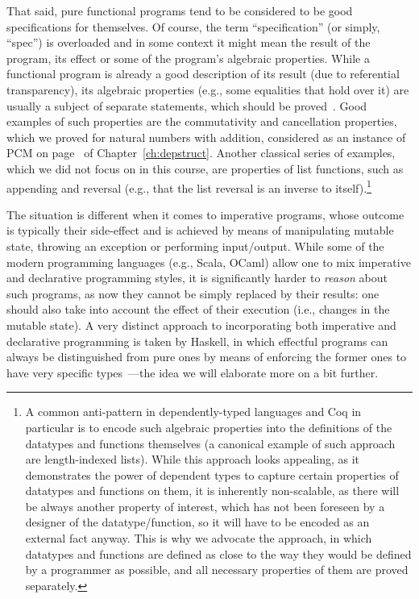 That said, pure functional programs tend to be considered to be good
specifications for themselves. Of course, the term ``specification'' (or
simply, ``spec'')  is overloaded and in
some context it might mean the result of the program, its effect or
some of the program's algebraic properties. While a functional program
is already a good description of its result (due to referential
transparency), its algebraic properties (e.g., some equalities that
hold over it) are usually a subject of separate statements, which
should be proved~\cite{Bird:BOOK}. Good examples of such properties
are the commutativity and cancellation properties, which we proved for
natural numbers with addition, considered as an instance of PCM on
page~\pageref{pg:addnprops} of Chapter~\ref{ch:depstruct}. Another
classical series of examples, which we did not focus on in this course,
are properties of list functions, such as appending and reversal
(e.g., that the list reversal is an inverse to itself).\footnote{A
common anti-pattern in dependently-typed languages and Coq in
particular is to encode such algebraic properties into the definitions
of the datatypes and functions themselves (a canonical example of such
approach are length-indexed lists). While this approach looks
appealing, as it demonstrates the power of dependent types to capture
certain properties of datatypes and functions on them, it is
inherently non-scalable, as there will be always another property of
interest, which has not been foreseen by a designer of the
datatype/function, so it will have to be encoded as an external fact
anyway. This is why we advocate the approach, in which datatypes and
functions are defined as close to the way they would be defined by a
programmer as possible, and all necessary properties of them are
proved separately.}


The situation is different when it comes to imperative programs, whose
outcome is typically their side-effect and is achieved by means of
manipulating mutable state, throwing an exception or performing
input/output. While some of the modern programming languages (e.g.,
Scala, OCaml) allow one to mix imperative and declarative programming
styles, it is significantly harder to \textit{reason} about such programs, as
now they cannot be simply replaced by their results: one should also
take into account the effect of their execution (i.e., changes in the
mutable state). A very distinct approach to incorporating both
imperative and declarative programming is taken by Haskell, in which
effectful programs can always be distinguished from pure ones by means
of enforcing the former ones to have very specific
types~\cite{PeytonJones-Wadler:POPL93}---the idea we will elaborate
more on a bit further.


